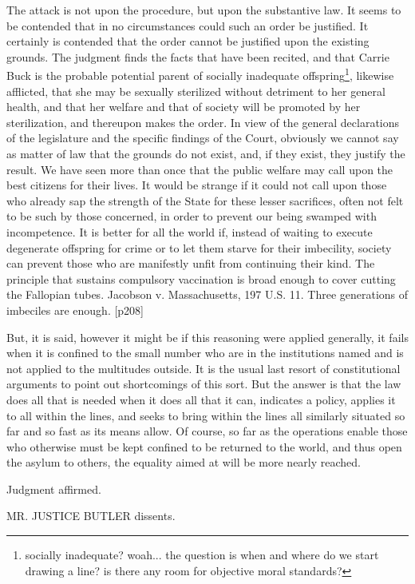 \documentclass[12pt]{letter}
\begin{document}
The attack is not upon the procedure, but upon the substantive law. It seems to be contended that in no circumstances could such an order be justified. It certainly is contended that the order cannot be justified upon the existing grounds. The judgment finds the facts that have been recited, and that Carrie Buck is the probable potential parent of socially inadequate offspring\footnote{socially inadequate? woah... the question is when and where do we start drawing a line? is there any room for objective moral standards?}, likewise afflicted, that she may be sexually sterilized without detriment to her general health, and that her welfare and that of society will be promoted by her sterilization, and thereupon makes the order. In view of the general declarations of the legislature and the specific findings of the Court, obviously we cannot say as matter of law that the grounds do not exist, and, if they exist, they justify the result. We have seen more than once that the public welfare may call upon the best citizens for their lives. It would be strange if it could not call upon those who already sap the strength of the State for these lesser sacrifices, often not felt to be such by those concerned, in order to prevent our being swamped with incompetence. It is better for all the world if, instead of waiting to execute degenerate offspring for crime or to let them starve for their imbecility, society can prevent those who are manifestly unfit from continuing their kind. The principle that sustains compulsory vaccination is broad enough to cover cutting the Fallopian tubes. Jacobson v. Massachusetts, 197 U.S. 11. Three generations of imbeciles are enough. [p208]

But, it is said, however it might be if this reasoning were applied generally, it fails when it is confined to the small number who are in the institutions named and is not applied to the multitudes outside. It is the usual last resort of constitutional arguments to point out shortcomings of this sort. But the answer is that the law does all that is needed when it does all that it can, indicates a policy, applies it to all within the lines, and seeks to bring within the lines all similarly situated so far and so fast as its means allow. Of course, so far as the operations enable those who otherwise must be kept confined to be returned to the world, and thus open the asylum to others, the equality aimed at will be more nearly reached.

Judgment affirmed.

MR. JUSTICE BUTLER dissents.
\end{document}

